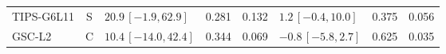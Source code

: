 \begin{longtable}{lcp{37mm}rrp{37mm}rr}
TIPS-G6L11 & S & \(20.9\,[-1.9,62.9]\) & 0.281 & 0.132 & \(1.2\,[-0.4,10.0]\) & 0.375 & 0.056\\
GSC-L2 & C & \(10.4\,[-14.0,42.4]\) & 0.344 & 0.069 & \(-0.8\,[-5.8,2.7]\) & 0.625 & 0.035\\

\end{longtable}
